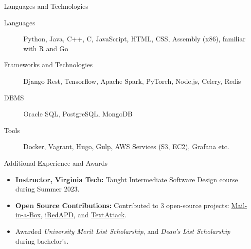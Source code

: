 \documentclass[]{mcdowellcv}
\begin{document}
	\begin{cvsection}{Languages and Technologies}
		\begin{cvsubsection}{}{}{}
			\begin{description}
				\item[Languages] Python, Java, C++, C, JavaScript, HTML, CSS, Assembly (x86), familiar with R and Go
				\item[Frameworks and Technologies] Django Rest, Tensorflow, Apache Spark, PyTorch, Node.js, Celery, Redis
				\item[DBMS] Oracle SQL, PostgreSQL, MongoDB
				\item[Tools] Docker, Vagrant, Hugo, Gulp, AWS Services (S3, EC2), Grafana etc. %
			\end{description}
		\end{cvsubsection}
	\end{cvsection}

	\begin{cvsection}{Additional Experience and Awards}
		\begin{cvsubsection}{}{}{}
			\begin{itemize}
				\item \textbf{Instructor, Virginia Tech:} Taught Intermediate Software Design course during Summer 2023.
    			\item \textbf{Open Source Contributions:} Contributed to 3 open-source projects: \href{https://github.com/mail-in-a-box/mailinabox}{Mail-in-a-Box}, \href{https://github.com/iredmail/iRedAPD}{iRedAPD}, and \href{https://github.com/QData/TextAttack}{TextAttack}.
				\item Awarded \emph{University Merit List Scholarship}, and \emph{Dean's List Scholarship} during bachelor's.
			\end{itemize}
		\end{cvsubsection}
	\end{cvsection}
\end{document}
